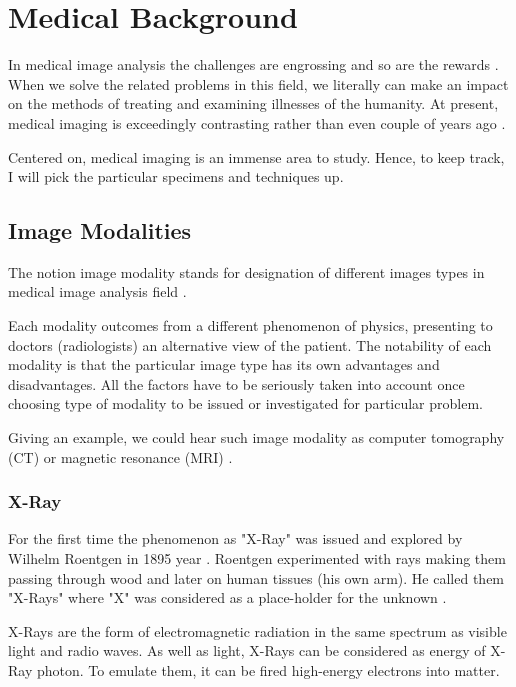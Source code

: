 \chapter{Medical Background}
\label{ch:rworks}

In medical image analysis the challenges are engrossing and so are the rewards \cite{Duncan2000}. When we solve the related problems in this field, we literally can make an impact on the methods of treating and examining illnesses of the humanity. At present, medical imaging is exceedingly contrasting rather than even couple of years ago \cite{Wang2020}. 

Centered on, medical imaging is an immense area to study. Hence, to keep track, I will pick the particular specimens and techniques up.

\section{Image Modalities}
The notion image modality stands for designation of different images types in medical image analysis field \cite{Seeram2004}.

Each modality outcomes from a different phenomenon of physics, presenting to doctors (radiologists) an alternative view of the patient. The notability of each modality is that the particular image type has its own advantages and disadvantages. All the factors have to be seriously taken into account once choosing type of modality to be issued or investigated for particular problem.

Giving an example, we could hear such image modality as computer tomography (CT) or magnetic resonance (MRI) \cite{VanderHeide2019}. 

\subsection{X-Ray}
For the first time the phenomenon as "X-Ray" was issued and explored by Wilhelm Roentgen in 1895 year \cite{Kirz2009}. Roentgen experimented with rays making them passing through wood and later on human tissues (his own arm). He called them "X-Rays" where "X" was considered as a place-holder for the unknown \cite{Barker1996}.

X-Rays are the form of electromagnetic radiation in the same spectrum as visible light and radio waves. As well as light, X-Rays can be considered as energy of X-Ray photon. To emulate them, it can be fired high-energy electrons into matter. 

